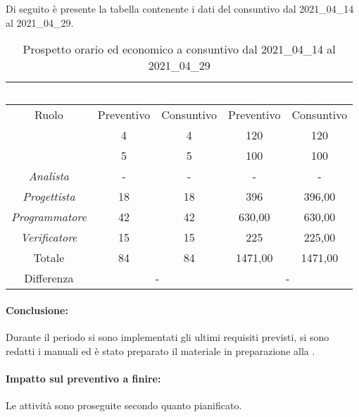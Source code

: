 Di seguito è presente la tabella contenente i dati del consuntivo dal 2021\_04\_14 al 2021\_04\_29.
\begin{table}[H]
	\centering
	\begin{tabular}{|c|c|c|c|c|}
		\rowcolor{darkblue} 
		&\multicolumn{2}{c|}{\textcolor{white}{Ore}}&\multicolumn{2}{c|}{\textcolor{white}{Costo in €}}\\ \hline
		Ruolo				&	Preventivo			&	Consuntivo		&	Preventivo	&	Consuntivo\\ \hline
		{\Responsabile}		&	4					&	4				&	120			&	120 \\ \hline
		{\Amministratore}	&	5					&	5				&	100			&	100 \\ \hline
		\textit{Analista}	&	-					&	-				&	-			&	- \\ \hline
		\textit{Progettista}& 	18					&   18 				& 	396			&  	396,00 \\ \hline
		\textit{Programmatore}& 42					& 	42				& 	630,00		&  	630,00 \\ \hline
		\textit{Verificatore}&	15					&	15				&	225			&	225,00 \\ \hline
		Totale				&	84					&	84				&	1471,00		&	1471,00 \\ \hline
		Differenza			& 	\multicolumn{2}{c|}{-} 					&\multicolumn{2}{c|}{-}\\ \hline
	\end{tabular}
	\caption{Prospetto orario ed economico a consuntivo dal 2021\_04\_14 al 2021\_04\_29}
\end{table}
\paragraph*{Conclusione:}
Durante il periodo si sono implementati gli ultimi requisiti previsti, si sono redatti i manuali ed è stato preparato il materiale in preparazione alla .
\paragraph*{Impatto sul preventivo a finire:}
Le attività sono proseguite secondo quanto pianificato.